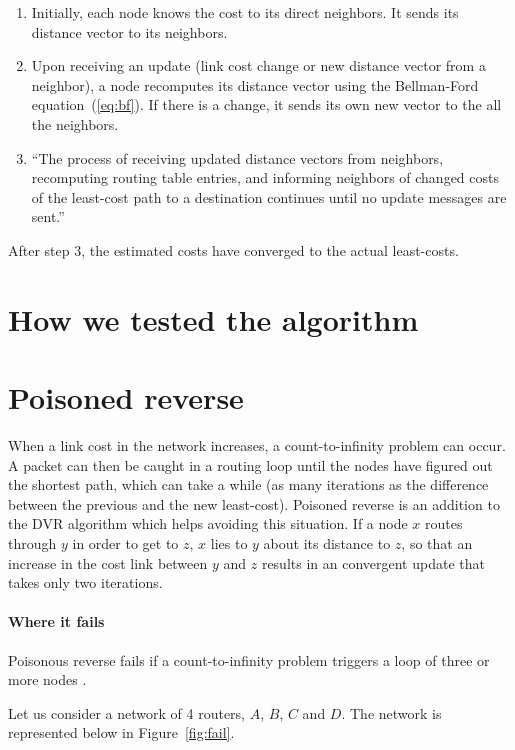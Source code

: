 \documentclass[12pt,a4paper]{article}
\begin{document}
\begin{enumerate}
\item Initially, each node knows the cost to its direct neighbors. It sends its distance vector to its neighbors.

\item Upon receiving an update (link cost change or new distance vector from a neighbor), a node recomputes its distance vector using the Bellman-Ford equation~(\ref{eq:bf}). If there is a change, it sends its own new vector to the all the neighbors.

\item ``The process of receiving updated distance vectors from neighbors, recomputing routing table entries, and informing neighbors of changed costs of the least-cost path to a destination continues until no update messages are sent.''~\cite[p.~375]{cn}
\end{enumerate}

After step 3, the estimated costs have converged to the actual least-costs.

\section{How we tested the algorithm}

\section{Poisoned reverse}
When a link cost in the network increases, a count-to-infinity problem can occur. A packet can then be caught in a routing loop until the nodes have figured out the shortest path, which can take a while (as many iterations as the difference between the previous and the new least-cost). Poisoned reverse is an addition to the DVR algorithm which helps avoiding this situation. If a node $x$ routes through $y$ in order to get to $z$, $x$ lies to $y$ about its distance to $z$, so that an increase in the cost link between $y$ and $z$ results in an convergent update that takes only two iterations. 

\paragraph{Where it fails}
Poisonous reverse fails if a count-to-infinity problem triggers a loop of three or more nodes \cite[p.~378]{cn}.

Let us consider a network of 4 routers, $A$, $B$, $C$ and $D$. The network is represented below in Figure~\ref{fig:fail}.
\end{document}
